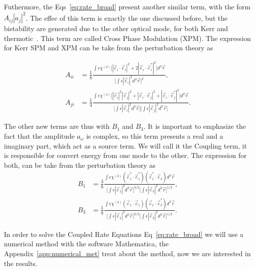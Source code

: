 Futhermore, the Eqs~\ref{eq:rate_broad} present another similar term, with the form $A_{ij}|a_j|^2$. The effec of this term is exactly the one discussed before, but the bistability are generated due to the other optical mode, for both Kerr and thermotic~\needcit. This term are called Cross Phase Modulation (XPM). The expression for Kerr SPM and XPM can be take from the perturbation theory as 


\begin{subequations}
    \begin{alignat}{1}
        A_{ii} &= \frac{1}{8}\frac{\int\epsilon\chi^{(3)}
        \Big[|\vec{e}_i\cdot\vec{e}_i|^2 + 2|\vec{e}_i\cdot\vec{e}_i^*|^2
        \Big]d^3\vec{r}}{\Big[\int \epsilon|\vec{e}_i|^2 d^3\vec{r}\Big]^2},
        \\
        A_{ji} &= \frac{1}{4}\frac{\int\epsilon\chi^{(3)}
        \Big[|\vec{e}_i|^2|\vec{e}_j|^2 + |\vec{e}_i\cdot\vec{e}_j|^2+ |\vec{e}_i\cdot\vec{e}_j^*|^2
        \Big]d^3\vec{r}}{\Big[\int \epsilon|\vec{e}_i|^2 d^3\vec{r}\Big]\Big[\int \epsilon|\vec{e}_j|^2 d^3\vec{r}\Big]}.
    \end{alignat}
\end{subequations}

The other new terms are thus with $B_1$ and $B_3$. It is important to emphasize the fact that the amplitude $a_\omega$ is complex, so this term presents a real and a imaginary part, which act as a source term. We will call it the Coupling term, it is responsible for convert energy from one mode to the other. The expression for both, can be take from the perturbation theory as
\begin{subequations}
    \begin{alignat}{1}
        B_{1} &= \frac{3}{8}\frac{\int\epsilon\chi^{(3)}
        (\vec{e}_1^*\cdot\vec{e}_1^*)(\vec{e}_1^*\cdot\vec{e}_3)
        d^3\vec{r}}{\Big[\int \epsilon|\vec{e}_1|^2 d^3\vec{r}\Big]^{3/2}\Big[\int \epsilon|\vec{e}_3|^2 d^3\vec{r}\Big]^{1/2}},
        \label{eq:coupling_b1}
        \\
        B_{3} &= \frac{1}{8}\frac{\int\epsilon\chi^{(3)}
        (\vec{e}_1\cdot\vec{e}_1)(\vec{e}_1\cdot\vec{e}^*_3)
        d^3\vec{r}}{\Big[\int \epsilon|\vec{e}_1|^2 d^3\vec{r}\Big]^{3/2}\Big[\int \epsilon|\vec{e}_3|^2 d^3\vec{r}\Big]^{1/2}}.
        \label{eq:coupling_b3}
    \end{alignat}
    \label{eq:coupling}
\end{subequations}

In order to solve the Coupled Rate Equations Eq~\ref{eq:rate_broad} we will use a numerical method with the software Mathematica, the Appendix~\ref{app:numerical_met} treat about the method, now we are interested in the results. 

